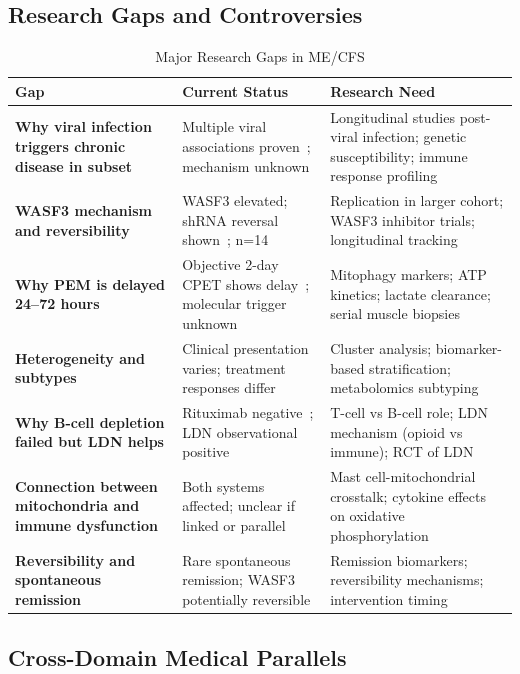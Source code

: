 \subsection{Research Gaps and Controversies}
\label{subsec:research-gaps}

\begin{table}[htbp]
\centering
\caption{Major Research Gaps in ME/CFS}
\label{tab:research-gaps}
\small
\begin{tabular}{p{3.5cm}p{5cm}p{5cm}}
\toprule
\textbf{Gap} & \textbf{Current Status} & \textbf{Research Need} \\
\midrule
\textbf{Why viral infection triggers chronic disease in subset} & Multiple viral associations proven~\cite{hwang2023viral}; mechanism unknown & Longitudinal studies post-viral infection; genetic susceptibility; immune response profiling \\
\midrule
\textbf{WASF3 mechanism and reversibility} & WASF3 elevated; shRNA reversal shown~\cite{wang2023wasf3}; n=14 & Replication in larger cohort; WASF3 inhibitor trials; longitudinal tracking \\
\midrule
\textbf{Why PEM is delayed 24--72 hours} & Objective 2-day CPET shows delay~\cite{Lim2020}; molecular trigger unknown & Mitophagy markers; ATP kinetics; lactate clearance; serial muscle biopsies \\
\midrule
\textbf{Heterogeneity and subtypes} & Clinical presentation varies; treatment responses differ & Cluster analysis; biomarker-based stratification; metabolomics subtyping \\
\midrule
\textbf{Why B-cell depletion failed but LDN helps} & Rituximab negative~\cite{Fluge2019}; LDN observational positive~\cite{Polo2019} & T-cell vs B-cell role; LDN mechanism (opioid vs immune); RCT of LDN \\
\midrule
\textbf{Connection between mitochondria and immune dysfunction} & Both systems affected; unclear if linked or parallel & Mast cell-mitochondrial crosstalk; cytokine effects on oxidative phosphorylation \\
\midrule
\textbf{Reversibility and spontaneous remission} & Rare spontaneous remission; WASF3 potentially reversible & Remission biomarkers; reversibility mechanisms; intervention timing \\
\bottomrule
\end{tabular}
\end{table}

\subsection{Cross-Domain Medical Parallels}
\label{subsec:cross-domain-evidence}

